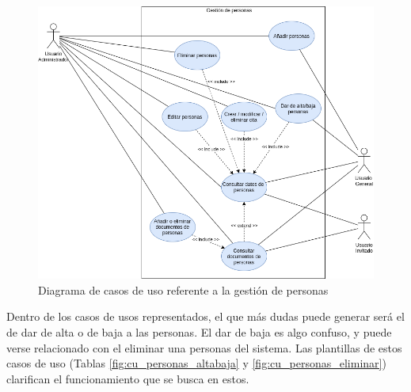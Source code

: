 \begin{figure}[h!]
    \centering
    \includegraphics[width=1\linewidth]{diseno/sistema/CU/personas.png}
    \caption{Diagrama de casos de uso referente a la gestión de personas}
    \label{fig:cu_personas}
\end{figure}

Dentro de los casos de usos representados, el que más dudas puede generar será el de dar de alta o de baja a las personas. El dar de baja es algo confuso, y puede verse relacionado con el eliminar una personas del sistema. Las plantillas de estos casos de uso (Tablas \ref{fig:cu_personas_altabaja} y \ref{fig:cu_personas_eliminar}) clarifican el funcionamiento que se busca en estos.

